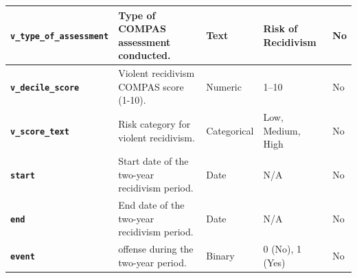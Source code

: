 \documentclass[conference]{IEEEtran}
\begin{document}
\begin{table}[!ht]
\begin{tabular}{|l|l|l|l|l|}
		\textbf{\texttt{v\_type\_of\_assessment}}	&	Type of COMPAS assessment conducted.	&	Text	&	Risk of Recidivism	&	No \\ \hline
		\textbf{\texttt{v\_decile\_score}}	&	Violent recidivism COMPAS score (1-10).	&	Numeric	&	1–10	&	No \\ \hline
		\textbf{\texttt{v\_score\_text}}	&	Risk category for violent recidivism.	&	Categorical	&	Low, Medium, High	&	No \\ \hline
		\textbf{\texttt{start}}	&	Start date of the two-year recidivism period.	&	Date	&	N/A	&	No \\ \hline
		\textbf{\texttt{end}}	&	End date of the two-year recidivism period.	&	Date	&	N/A	&	No \\ \hline
		\textbf{\texttt{event}}	&	offense during the two-year period.	&	Binary	&	0 (No), 1 (Yes)	&	No \\ \hline
	\end{tabular}
\end{table}
\end{document}

